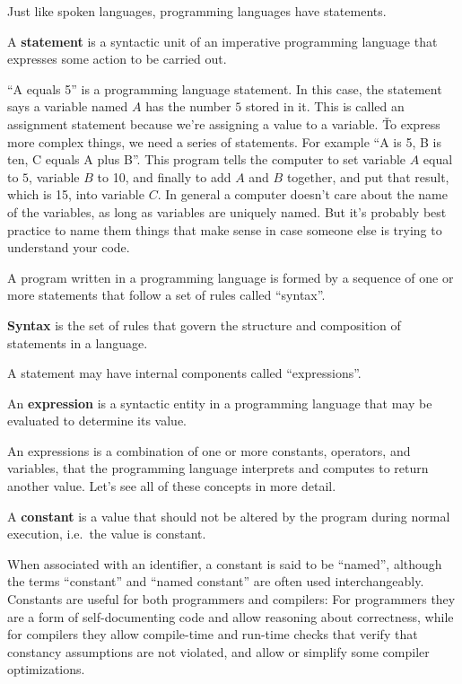 Just like spoken languages, programming languages have statements.

\bd[Statement]
A \textbf{statement} is a syntactic unit of an imperative programming language that expresses some action to be carried
out.
\ed

\be
``A equals 5'' is a programming language statement. In this case, the statement says a variable named $A$ has the number
$5$ stored in it. This is called an assignment statement because we're assigning a value to a variable. \v

To express more complex things, we need a series of statements. For example ``A is 5, B is ten, C equals A plus B''.
This program tells the computer to set variable $A$ equal to $5$, variable $B$ to 10, and finally to add $A$ and $B$
together, and put that result, which is 15, into variable $C$. In general a computer doesn't care about the name of
the variables, as long as variables are uniquely named. But it's probably best practice to name them things that make
sense in case someone else is trying to understand your code.
\ee

A program written in a programming language is formed by a sequence of one or more statements that follow a set of rules
called ``syntax''.

\bd[Syntax]
\textbf{Syntax} is the set of rules that govern the structure and composition of statements in a language.
\ed

A statement may have internal components called ``expressions''.

\bd[Expression]
An \textbf{expression} is a syntactic entity in a programming language that may be evaluated to determine its value.
\ed

An expressions is a combination of one or more constants, operators, and variables, that the programming language
interprets and computes to return another value. Let's see all of these concepts in more detail.

\bd[Constant]
A \textbf{constant} is a value that should not be altered by the program during normal execution, i.e.\ the value is
constant.
\ed

When associated with an identifier, a constant is said to be ``named'', although the terms ``constant'' and ``named
constant'' are often used interchangeably. Constants are useful for both programmers and compilers: For programmers
they are a form of self-documenting code and allow reasoning about correctness, while for compilers they allow
compile-time and run-time checks that verify that constancy assumptions are not violated, and allow or simplify some
compiler optimizations.

